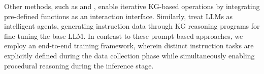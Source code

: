 Other methods, such as \citet{jiang-etal-2023-structgpt} and \citet{xiong-etal-2024-interactive}, enable iterative KG-based operations by integrating pre-defined functions as an interaction interface. Similarly, \citet{jiang2024kg} treat LLMs as intelligent agents, generating instruction data through KG reasoning programs for fine-tuning the base LLM. In contrast to these prompt-based approaches, we employ an end-to-end training framework, wherein distinct instruction tasks are explicitly defined during the data collection phase while simultaneously enabling procedural reasoning during the inference stage. 


